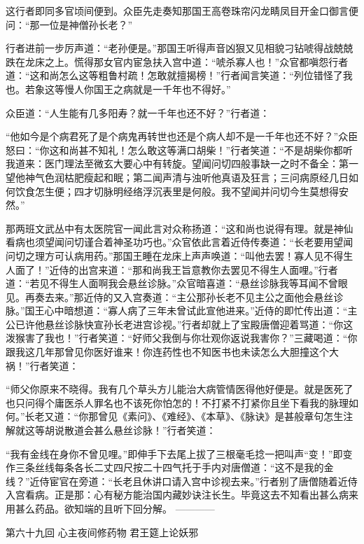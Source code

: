 \documentclass[12pt,UTF8]{ctexbook}
\begin{document}
这行者即同多官顷间便到。众臣先走奏知那国王高卷珠帘闪龙睛凤目开金口御言便问：“那一位是神僧孙长老？”

行者进前一步厉声道：“老孙便是。”那国王听得声音凶狠又见相貌刁钻唬得战兢兢跌在龙床之上。慌得那女官内宦急扶入宫中道：“唬杀寡人也！”众官都嗔怨行者道：“这和尚怎么这等粗鲁村疏！怎敢就擅揭榜！”行者闻言笑道：“列位错怪了我也。若象这等慢人你国王之病就是一千年也不得好。”

众臣道：“人生能有几多阳寿？就一千年也还不好？”行者道：

“他如今是个病君死了是个病鬼再转世也还是个病人却不是一千年也还不好？”众臣怒曰：“你这和尚甚不知礼！怎么敢这等满口胡柴！”行者笑道：“不是胡柴你都听我道来：医门理法至微玄大要心中有转旋。望闻问切四般事缺一之时不备全：第一望他神气色润枯肥瘦起和眠；第二闻声清与浊听他真语及狂言；三问病原经几日如何饮食怎生便；四才切脉明经络浮沉表里是何般。我不望闻并问切今生莫想得安然。”

那两班文武丛中有太医院官一闻此言对众称扬道：“这和尚也说得有理。就是神仙看病也须望闻问切谨合着神圣功巧也。”众官依此言着近侍传奏道：“长老要用望闻问切之理方可认病用药。”那国王睡在龙床上声声唤道：“叫他去罢！寡人见不得生人面了！”近侍的出宫来道：“那和尚我王旨意教你去罢见不得生人面哩。”行者道：“若见不得生人面啊我会悬丝诊脉。”众官暗喜道：“悬丝诊脉我等耳闻不曾眼见。再奏去来。”那近侍的又入宫奏道：“主公那孙长老不见主公之面他会悬丝诊脉。”国王心中暗想道：“寡人病了三年未曾试此宣他进来。”近侍的即忙传出道：“主公已许他悬丝诊脉快宣孙长老进宫诊视。”行者却就上了宝殿唐僧迎着骂道：“你这泼猴害了我也！”行者笑道：“好师父我倒与你壮观你返说我害你？”三藏喝道：“你跟我这几年那曾见你医好谁来！你连药性也不知医书也未读怎么大胆撞这个大祸！”行者笑道：

“师父你原来不晓得。我有几个草头方儿能治大病管情医得他好便是。就是医死了也只问得个庸医杀人罪名也不该死你怕怎的！不打紧不打紧你且坐下看我的脉理如何。”长老又道：“你那曾见《素问》、《难经》、《本草》、《脉诀》是甚般章句怎生注解就这等胡说散道会甚么悬丝诊脉！”行者笑道：

“我有金线在身你不曾见哩。”即伸手下去尾上拔了三根毫毛捻一把叫声“变！”即变作三条丝线每条各长二丈四尺按二十四气托于手内对唐僧道：“这不是我的金线？”近侍宦官在旁道：“长老且休讲口请入宫中诊视去来。”行者别了唐僧随着近侍入宫看病。正是那：心有秘方能治国内藏妙诀注长生。毕竟这去不知看出甚么病来用甚么药品。欲知端的且听下回分解。
------------

第六十九回 心主夜间修药物 君王筵上论妖邪
\end{document}
